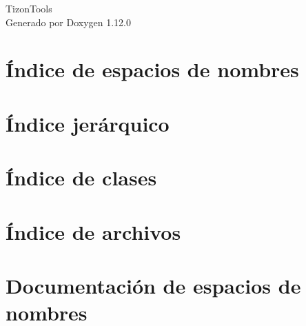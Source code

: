 \documentclass[twoside]{book}
\newcommand{\+}{\discretionary{\mbox{\scriptsize$\hookleftarrow$}}{}{}}
\newcommand{\clearemptydoublepage}{%
    \newpage{\pagestyle{empty}\cleardoublepage}%
  }
\begin{document}
  \raggedbottom
  \begin{titlepage}
  \vspace*{7cm}
  \begin{center}%
  {\Large Tizon\+Tools}\\
  \vspace*{1cm}
  {\large Generado por Doxygen 1.12.0}\\
  \end{center}
  \end{titlepage}
  \clearemptydoublepage
  \tableofcontents
  \clearemptydoublepage

\chapter{Índice de espacios de nombres}

\chapter{Índice jerárquico}

\chapter{Índice de clases}

\chapter{Índice de archivos}

\chapter{Documentación de espacios de nombres}












\end{document}
